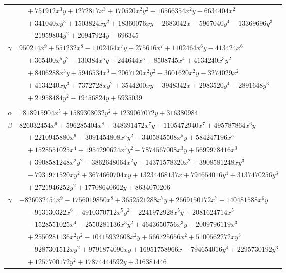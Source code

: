 \documentclass[11pt]{article}
\begin{document}
\begin{longtable}{@{}ll@{}}
 & $\quad +751912x^{3}y+1272817x^{3}+170520x^{2}y^{2}+16566354x^{2}y-6634404x^{2}$\\
 & $\quad +341040xy^{3}+1503824xy^{2}+18360076xy-2683042x-5967040y^{4}-13369696y^{3}$\\
 & $\quad -21959804y^{2}+20947924y-696345$\\
$\gamma$ & $950214x^{9}+551232x^{8}-1102464x^{7}y+275616x^{7}+1102464x^{6}y-413424x^{6}$\\
 & $\quad +365400x^{5}y^{2}-130384x^{5}y+244644x^{5}-8508745x^{4}+4134240x^{3}y^{2}$\\
 & $\quad +8406288x^{3}y+5946534x^{3}-2067120x^{2}y^{2}-3601620x^{2}y-3274029x^{2}$\\
 & $\quad +4134240xy^{3}+7372728xy^{2}+3544200xy-3948342x+2983520y^{4}+2891648y^{3}$\\
 & $\quad +21958484y^{2}-19456824y+5935039$\\
\addlinespace[3pt]
\multicolumn{2}{@{}l}{$\{i,j\}=\{20,21\}$, $k_{ij}=2\cdot 3\cdot 7\cdot 11$}\\
$\alpha$ & $1818915904x^{5}+1589308032y^{2}+1239067072y+316380984$\\
$\beta$ & $826032454x^{9}+596285404x^{8}-348391472x^{7}y+1105472940x^{7}+495787864x^{6}y$\\
 & $\quad +2210945880x^{6}-3091454808x^{5}y^{2}-3405845508x^{5}y+584247196x^{5}$\\
 & $\quad +1528551025x^{4}+1954290624x^{3}y^{2}-7874567008x^{3}y+5699978416x^{3}$\\
 & $\quad +3908581248x^{2}y^{2}-3862648064x^{2}y+14371578320x^{2}+3908581248xy^{3}$\\
 & $\quad -7931971520xy^{2}+3674660704xy+13234468137x+794654016y^{4}+3137470256y^{3}$\\
 & $\quad +2721946252y^{2}+17708640662y+8634070206$\\
$\gamma$ & $-826032454x^{9}-1756019850x^{8}+3652521288x^{7}y+2669150172x^{7}-140481588x^{6}y$\\
 & $\quad -913130322x^{6}-4910370712x^{5}y^{2}-2241972928x^{5}y+2081624714x^{5}$\\
 & $\quad -1528551025x^{4}-2550281136x^{3}y^{2}+4643650756x^{3}y-2009796119x^{3}$\\
 & $\quad +2550281136x^{2}y^{2}-10415932608x^{2}y+566725656x^{2}+5100562272xy^{3}$\\
 & $\quad -9287301512xy^{2}+9791874090xy+16951758966x-794654016y^{4}+2295730192y^{3}$\\
 & $\quad +1257700172y^{2}+17874444592y+316381446$\\

\end{longtable}
\end{document}
